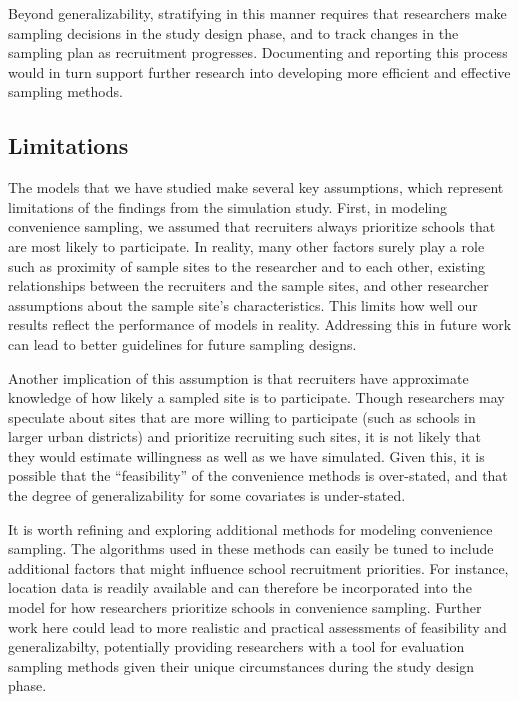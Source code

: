 \documentclass[man,floatsintext]{apa6}
\begin{document}
Beyond generalizability, stratifying in this manner requires that researchers make sampling decisions in the study design phase, and to track changes in the sampling plan as recruitment progresses. Documenting and reporting this process would in turn support further research into developing more efficient and effective sampling methods.

\hypertarget{limitations}{%
\subsection{Limitations}\label{limitations}}

The models that we have studied make several key assumptions, which represent limitations of the findings from the simulation study. First, in modeling convenience sampling, we assumed that recruiters always prioritize schools that are most likely to participate. In reality, many other factors surely play a role such as proximity of sample sites to the researcher and to each other, existing relationships between the recruiters and the sample sites, and other researcher assumptions about the sample site's characteristics. This limits how well our results reflect the performance of models in reality. Addressing this in future work can lead to better guidelines for future sampling designs.

Another implication of this assumption is that recruiters have approximate knowledge of how likely a sampled site is to participate. Though researchers may speculate about sites that are more willing to participate (such as schools in larger urban districts) and prioritize recruiting such sites, it is not likely that they would estimate willingness as well as we have simulated. Given this, it is possible that the \enquote{feasibility} of the convenience methods is over-stated, and that the degree of generalizability for some covariates is under-stated.

It is worth refining and exploring additional methods for modeling convenience sampling. The algorithms used in these methods can easily be tuned to include additional factors that might influence school recruitment priorities. For instance, location data is readily available and can therefore be incorporated into the model for how researchers prioritize schools in convenience sampling. Further work here could lead to more realistic and practical assessments of feasibility and generalizabilty, potentially providing researchers with a tool for evaluation sampling methods given their unique circumstances during the study design phase.
\end{document}
